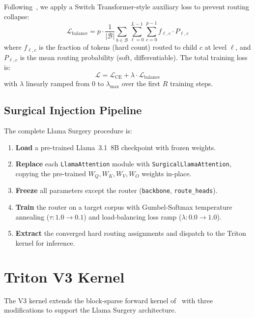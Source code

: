 \documentclass[11pt,a4paper]{article}
\begin{document}
Following~\citet{fedus2022switch}, we apply a Switch Transformer-style auxiliary loss to prevent routing collapse:
\begin{equation}
    \mathcal{L}_{\text{balance}} = p \cdot \frac{1}{|\mathcal{B}|} \sum_{b \in \mathcal{B}} \sum_{\ell=0}^{L-1} \sum_{c=0}^{p-1} f_{\ell,c} \cdot P_{\ell,c}
\end{equation}
where $f_{\ell,c}$ is the fraction of tokens (hard count) routed to child $c$ at level $\ell$, and $P_{\ell,c}$ is the mean routing probability (soft, differentiable). The total training loss is:
\begin{equation}
    \mathcal{L} = \mathcal{L}_{\text{CE}} + \lambda \cdot \mathcal{L}_{\text{balance}}
\end{equation}
with $\lambda$ linearly ramped from $0$ to $\lambda_{\max}$ over the first $R$ training steps.

\subsection{Surgical Injection Pipeline}

The complete Llama Surgery procedure is:
\begin{enumerate}
    \item \textbf{Load} a pre-trained Llama~3.1~8B checkpoint with frozen weights.
    \item \textbf{Replace} each \texttt{LlamaAttention} module with \texttt{SurgicalLlamaAttention}, copying the pre-trained $W_Q, W_K, W_V, W_O$ weights in-place.
    \item \textbf{Freeze} all parameters except the router (\texttt{backbone}, \texttt{route\_heads}).
    \item \textbf{Train} the router on a target corpus with Gumbel-Softmax temperature annealing ($\tau: 1.0 \to 0.1$) and load-balancing loss ramp ($\lambda: 0.0 \to 1.0$).
    \item \textbf{Extract} the converged hard routing assignments and dispatch to the Triton kernel for inference.
\end{enumerate}

\section{Triton V3 Kernel}
\label{sec:triton}

The V3 kernel extends the block-sparse forward kernel of~\citet{learningtoskip2026} with three modifications to support the Llama Surgery architecture.
\end{document}
